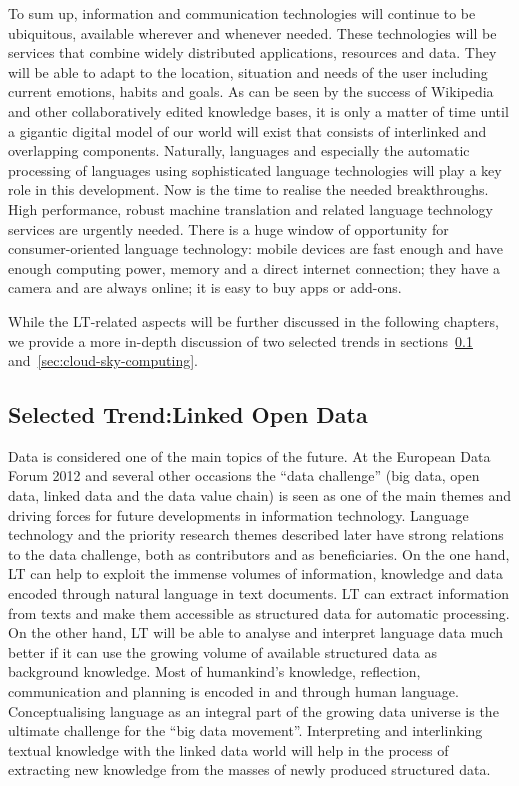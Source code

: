 \documentclass[10pt, plain]{../../metanetpaper}
\begin{document}
\begin{multicols}{2}
To sum up, information and communication technologies will continue to be ubiquitous, available wherever and whenever needed. These technologies will be services that combine widely distributed applications, resources and data. They will be able to adapt to the location, situation and needs of the user including current emotions, habits and goals. As can be seen by the success of Wikipedia and other collaboratively edited knowledge bases, it is only a matter of time until a gigantic digital model of our world will exist that consists of interlinked and overlapping components. Naturally, languages and especially the automatic processing of languages using sophisticated language technologies will play a key role in this development. Now is the time to realise the needed breakthroughs. High performance, robust machine translation and related language technology services are urgently needed. There is a huge window of opportunity for consumer-oriented language technology: mobile devices are fast enough and have enough computing power, memory and a direct internet connection; they have a camera and are always online; it is easy to buy apps or add-ons.

While the LT-related aspects will be further discussed in the following chapters, we provide a more in-depth discussion of two selected trends in sections~\ref{sec:linked-data-open} and~\ref{sec:cloud-sky-computing}.

\subsection[Selected Trend: Linked Open Data]{Selected Trend:\newline Linked Open Data}
\label{sec:linked-data-open}

Data is considered one of the main topics of the future. At the European Data Forum 2012 and several other occasions the ``data challenge'' (big data, open data, linked data and the data value chain) is seen as one of the main themes and driving forces for future developments in information technology. Language technology and the priority research themes described later have strong relations to the data challenge, both as contributors and as beneficiaries. On the one hand, LT can help to exploit the immense volumes of information, knowledge and data encoded through natural language in text documents. LT can extract information from texts and make them accessible as structured data for automatic processing. On the other hand, LT will be able to analyse and interpret language data much better if it can use the growing volume of available structured data as background knowledge. 
%
Most of humankind's knowledge, reflection, communication and planning is encoded in and through human language. Conceptualising language as an integral part of the growing data universe is the ultimate challenge for the “big data movement”. Interpreting and interlinking textual knowledge with the linked data world will help in the process of extracting new knowledge from the masses of newly produced structured data.


\end{multicols}
\end{document}
